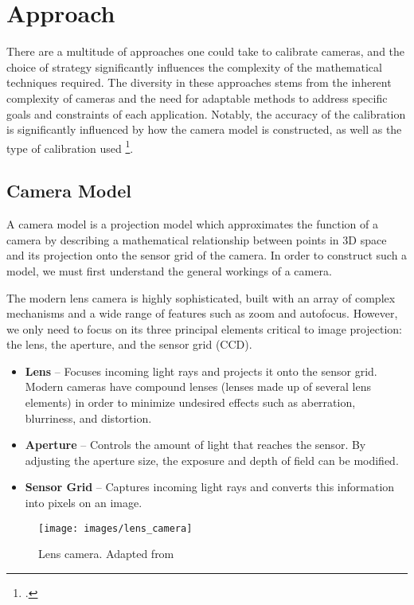 \section{Approach} 

There are a multitude of approaches one could take to calibrate cameras, and the choice of strategy significantly influences the complexity of the mathematical techniques required. The diversity in these approaches stems from the inherent complexity of cameras and the need for adaptable methods to address specific goals and constraints of each application. Notably, the accuracy of the calibration is significantly influenced by how the camera model is constructed, as well as the type of calibration used \footcite{weisunRequirementsCamera2005}.

\subsection{Camera Model} \label{sec:camera_model}

A camera model is a projection model which approximates the function of a camera by describing a mathematical relationship between points in 3D space and its projection onto the sensor grid of the camera. In order to construct such a model, we must first understand the general workings of a camera.

The modern lens camera is highly sophisticated, built with an array of complex mechanisms and a wide range of features such as zoom and autofocus. However, we only need to focus on its three principal elements critical to image projection: the lens, the aperture, and the sensor grid (CCD). 

\begin{itemize}[leftmargin=!, itemindent=-5ex]
    \item \textbf{Lens} -- Focuses incoming light rays and projects it onto the sensor grid. Modern cameras have compound lenses (lenses made up of several lens elements) in order to minimize undesired effects such as aberration, blurriness, and distortion. 
    \item \textbf{Aperture} -- Controls the amount of light that reaches the sensor. By adjusting the aperture size, the exposure and depth of field can be modified.
    \item \textbf{Sensor Grid} -- Captures incoming light rays and converts this information into pixels on an image. 
\end{itemize}

\begin{figure}[H]
    \centering
    \texttt{[image: images/lens\_camera]}
    \caption{Lens camera. Adapted from \cite{coltonPhysics1232012}} \label{fig:lens_camera}
\end{figure}

